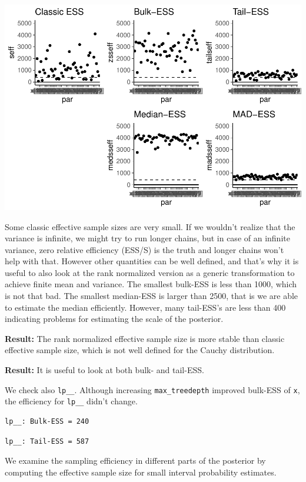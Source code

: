 \documentclass[american,]{article}
\begin{document}
\includegraphics{graphics/ess-fit-nom-td20-1.pdf}

Some classic effective sample sizes are very small. If we wouldn't
realize that the variance is infinite, we might try to run longer
chains, but in case of an infinite variance, zero relative efficiency
(ESS/S) is the truth and longer chains won't help with that. However
other quantities can be well defined, and that's why it is useful to
also look at the rank normalized version as a generic transformation to
achieve finite mean and variance. The smallest bulk-ESS is less than
1000, which is not that bad. The smallest median-ESS is larger than
2500, that is we are able to estimate the median efficiently. However,
many tail-ESS's are less than 400 indicating problems for estimating the
scale of the posterior.

\textbf{Result:} The rank normalized effective sample size is more
stable than classic effective sample size, which is not well defined for
the Cauchy distribution.

\textbf{Result:} It is useful to look at both bulk- and tail-ESS.

We check also \texttt{lp\_\_}. Although increasing
\texttt{max\_treedepth} improved bulk-ESS of \texttt{x}, the efficiency
for \texttt{lp\_\_} didn't change.

\begin{verbatim}
lp__: Bulk-ESS = 240
\end{verbatim}

\begin{verbatim}
lp__: Tail-ESS = 587
\end{verbatim}

We examine the sampling efficiency in different parts of the posterior
by computing the effective sample size for small interval probability
estimates.
\end{document}
